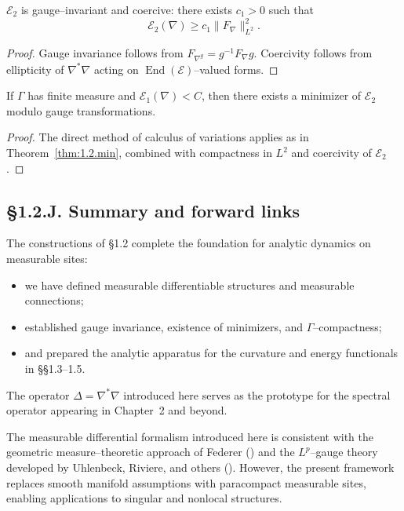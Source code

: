 \begin{lemma}\label{lem:1.2.second}
$\mathcal E_2$ is gauge–invariant and coercive: there exists $c_1>0$ such that
\[
\mathcal E_2(\nabla)\ge c_1\|F_\nabla\|_{L^2}^2.
\]
\end{lemma}

\begin{proof}
Gauge invariance follows from $F_{\nabla^g}=g^{-1}F_\nabla g$. Coercivity follows from ellipticity of $\nabla^\ast\nabla$ acting on $\operatorname{End}(\mathcal E)$–valued forms.
\end{proof}

\begin{theorem}\label{thm:1.2.harmonic}
If $\Gamma$ has finite measure and $\mathcal E_1(\nabla)<C$, then there exists a minimizer of $\mathcal E_2$ modulo gauge transformations.
\end{theorem}

\begin{proof}
The direct method of calculus of variations applies as in Theorem~\ref{thm:1.2.min}, combined with compactness in $L^2$ and coercivity of $\mathcal E_2$.
\end{proof}

\subsection*{§1.2.J. Summary and forward links}

The constructions of §1.2 complete the foundation for analytic dynamics on measurable sites:
\begin{itemize}
  \item we have defined measurable differentiable structures and measurable connections;
  \item established gauge invariance, existence of minimizers, and $\Gamma$–compactness;
  \item and prepared the analytic apparatus for the curvature and energy functionals in §§1.3–1.5.
\end{itemize}
The operator $\Delta=\nabla^\ast\nabla$ introduced here serves as the prototype for the spectral operator appearing in Chapter~2 and beyond.

\begin{remark}
The measurable differential formalism introduced here is consistent with the geometric measure–theoretic approach of Federer (\cite{FedererGMT}) and the $L^p$–gauge theory developed by Uhlenbeck, Riviere, and others (\cite{Uhlenbeck1982, Riviere2007, Bethuel1992}).  
However, the present framework replaces smooth manifold assumptions with paracompact measurable sites, enabling applications to singular and nonlocal structures.
\end{remark}


